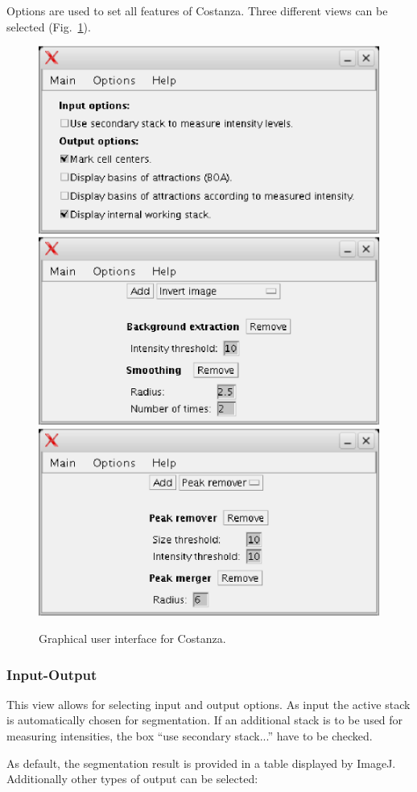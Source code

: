 \documentclass[a4paper,12pt]{article}
\begin{document}
Options are used to set all features of Costanza. Three different views can be
selected (Fig.~\ref{fig:gui}). 

\begin{figure}[h!]
\begin{center}
\includegraphics[width=0.5\columnwidth]{figures/GUI_input_output.eps}\\
\includegraphics[width=0.5\columnwidth]{figures/GUI_pre.eps}\\
\includegraphics[width=0.5\columnwidth]{figures/GUI_post.eps}
\caption{Graphical user interface for Costanza.}
\label{fig:gui}
\end{center}
\end{figure}
%

\subsubsection{Input-Output}

This view allows for selecting input and output options. As input the active
stack is automatically chosen for segmentation. If an additional stack is to
be used for measuring intensities, the box ``use secondary stack...'' have to
be checked.

As default, the segmentation result is provided in a table displayed by
ImageJ. Additionally other types of output can be selected:
\end{document}
